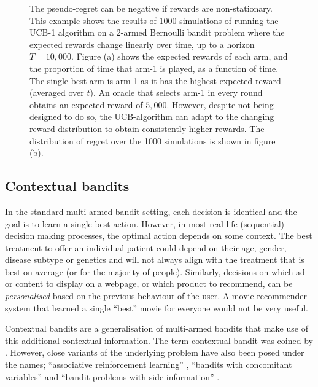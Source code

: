 \documentclass[11pt,a4paper,twoside]{report}
\newcommand{\quotes}[1]{``#1''}
\theoremstyle{plain}
\theoremstyle{definition}
\begin{document}
\begin{figure}[ht]
\begin{subfigure}[t]{0.49\textwidth}
    \end{subfigure}
      \caption{The pseudo-regret can be negative if rewards are non-stationary. This example shows the results of 1000 simulations of running the UCB-1 algorithm on a 2-armed Bernoulli bandit problem where the expected rewards change linearly over time, up to a horizon $T=10,000$. Figure (a) shows the expected rewards of each arm, and the proportion of time that arm-1 is played, as a function of time. The single best-arm is arm-1 as it has the highest expected reward (averaged over $t$). An oracle that selects arm-1 in every round obtains an expected reward of $5,000$. However, despite not being designed to do so, the UCB-algorithm can adapt to the changing reward distribution to obtain consistently higher rewards. The distribution of regret over the 1000 simulations is shown in figure (b).}\label{fig:non-stationary-bandit}
\end{figure}

\subsection{Contextual bandits}
\label{sec:contextual-bandits}

In the standard multi-armed bandit setting, each decision is identical and the goal is to learn a single best action. However, in most real life (sequential) decision making processes, the optimal action depends on some context. The best treatment to offer an individual patient could depend on their age, gender, disease subtype or genetics and will not always align with the treatment that is best on average (or for the majority of people).  Similarly, decisions on which ad or content to display on a webpage, or which product to recommend, can be \emph{personalised} based on the previous behaviour of the user. A movie recommender system that learned a single \quotes{best} movie for everyone would not be very useful. 

Contextual bandits are a generalisation of multi-armed bandits that make use of this additional contextual information. The term contextual bandit was coined by \citet{Langford2008}. However, close variants of the underlying problem have also been posed under the names; \quotes{associative reinforcement learning} \citep{kaelbling1994associative}, \quotes{bandits with concomitant variables}\citep{woodroofe1979one} and  \quotes{bandit problems with side information} \citep{wang2005bandit}. 
\end{document}
